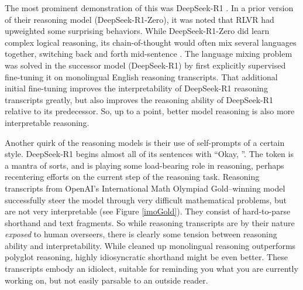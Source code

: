The most prominent demonstration of this was DeepSeek-R1
\cite{deepseekai2025deepseek}. In a prior version of their reasoning model
(DeepSeek-R1-Zero), it was noted that RLVR had upweighted some surprising
behaviors. While DeepSeek-R1-Zero did learn complex logical reasoning, its
chain-of-thought would often mix several languages together, switching back and
forth mid-sentence \cite{deepseekai2025deepseek}. The language mixing problem
was solved in the successor model (DeepSeek-R1) by first explicitly supervised
fine-tuning it on monolingual English reasoning transcripts. That additional
initial fine-tuning improves the interpretability of DeepSeek-R1 reasoning
transcripts greatly, but also improves the reasoning ability of DeepSeek-R1
relative to its predecessor. So, up to a point, better model reasoning is also
more interpretable reasoning.

Another quirk of the reasoning models is their use of self-prompts of a certain
style. DeepSeek-R1 begins almost all of its sentences with ``Okay, ''. The
token is a mantra of sorts, and is playing some load-bearing role in reasoning,
perhaps recentering efforts on the current step of the reasoning task.
Reasoning transcripts from OpenAI's International Math Olympiad Gold--winning
model successfully steer the model through very difficult mathematical
problems, but are not very interpretable (see Figure \ref{imoGold}). They
consist of hard-to-parse shorthand and text fragments. So while reasoning
transcripts are by their nature \emph{exposed} to human overseers, there is
clearly some tension between reasoning ability and interpretability. While
cleaned up monolingual reasoning outperforms polyglot reasoning, highly
idiosyncratic shorthand might be even better. These transcripts embody an
idiolect, suitable for reminding you what you are currently working on, but not
easily parsable to an outside reader.

